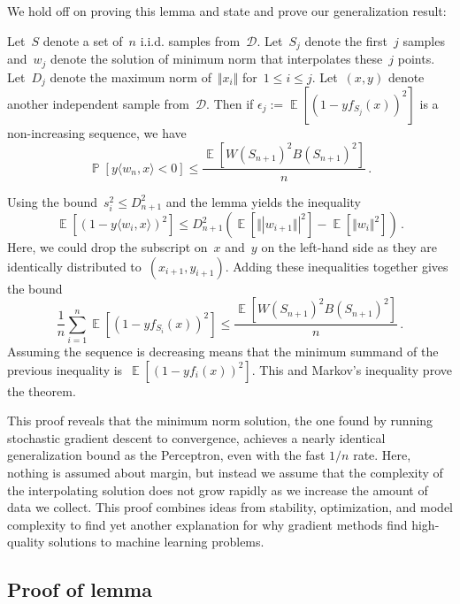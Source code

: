 \documentclass{tufte-book}
\begin{document}
We hold off on proving this lemma and state and prove our generalization
result:

\begin{Theorem}

Let~\(S\) denote a set of~\(n\) i.i.d. samples from~\(\mathcal{D}\).
Let~\(S_j\) denote the first~\(j\) samples and~\(w_j\) denote the
solution of minimum norm that interpolates these~\(j\) points.
Let~\(D_j\) denote the maximum norm of~\(\Vert x_i \Vert\)
for~\(1\leq i\leq j\). Let~\((x,y)\) denote another independent sample
from~\(\mathcal{D}\). Then if
\(\epsilon_j:=\mathop\mathbb{E}[(1 - y f_{S_j}(x))^2]\) is a
non-increasing sequence, we have \[
    \mathop\mathbb{P}[ y \langle w_{n}, x \rangle < 0] \leq  \frac{\mathop\mathbb{E}[W(S_{n+1})^2 B(S_{n+1})^2]}{n}\,.
\]

\end{Theorem}

\begin{Proof}

Using the bound~\(s_i^2 \leq D_{n+1}^2\) and the lemma yields the
inequality \[
    \mathop\mathbb{E}[(1-y \langle w_i, x \rangle)^2] \leq D_{n+1}^2 (\mathop\mathbb{E}[\Vert| w_{i+1} \Vert|^2]-\mathop\mathbb{E}[\Vert w_i\Vert^2])\,.
\] Here, we could drop the subscript on~\(x\) and~\(y\) on the left-hand
side as they are identically distributed to~\((x_{i+1},y_{i+1})\).
Adding these inequalities together gives the bound \[
    \frac{1}{n} \sum_{i=1}^n \mathop\mathbb{E}[(1 - y f_{S_i}(x))^2]  \leq \frac{\mathop\mathbb{E}[W(S_{n+1})^2 B(S_{n+1})^2]}{n}\,.
\] Assuming the sequence is decreasing means that the minimum summand of
the previous inequality is~\(\mathop\mathbb{E}[(1 - y f_{i}(x))^2]\).
This and Markov's inequality prove the theorem.

\end{Proof}

This proof reveals that the minimum norm solution, the one found by
running stochastic gradient descent to convergence, achieves a nearly
identical generalization bound as the Perceptron, even with the fast
\(1/n\) rate. Here, nothing is assumed about margin, but instead we
assume that the complexity of the interpolating solution does not grow
rapidly as we increase the amount of data we collect. This proof
combines ideas from stability, optimization, and model complexity to
find yet another explanation for why gradient methods find high-quality
solutions to machine learning problems.

\hypertarget{proof-of-lemma}{%
\subsection{Proof of lemma}\label{proof-of-lemma}}
\end{document}
